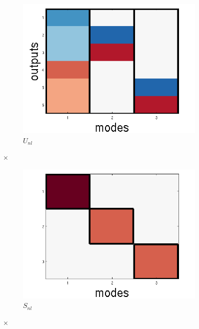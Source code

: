 \documentclass[10pt,letterpaper]{article}
\begin{document}
\begin{figure}
\centering
\begin{subfigure}{0.22\textwidth}
\includegraphics[width=\textwidth]{figures/U_nl.png}
\caption{$U_{nl}$}
\end{subfigure}
\LARGE{$\times$}
\begin{subfigure}{0.22\textwidth}
\includegraphics[width=\textwidth]{figures/S_nl.png}
\caption{$S_{nl}$}
\end{subfigure}
\LARGE{$\times$}
\begin{subfigure}{0.22\textwidth}

\end{subfigure}
\end{figure}
\end{document}
